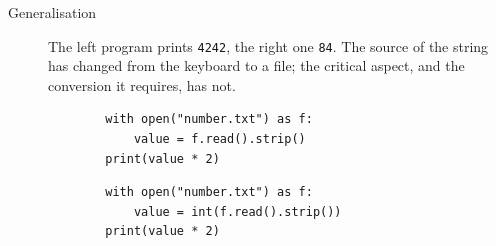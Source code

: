 \begin{description}
  \item[Generalisation] The left program prints \texttt{4242}, the right
    one \texttt{84}.
    The source of the string has changed from the keyboard to a file; the
    critical aspect, and the conversion it requires, has not.

    \hfill
    \begin{minipage}[t]{0.45\columnwidth}
      \begin{verbatim}
        with open("number.txt") as f:
            value = f.read().strip()
        print(value * 2)
      \end{verbatim}
    \end{minipage}
    \hfill
    \begin{minipage}[t]{0.45\columnwidth}
      \begin{verbatim}
        with open("number.txt") as f:
            value = int(f.read().strip())
        print(value * 2)
      \end{verbatim}
    \end{minipage}
\end{description}
